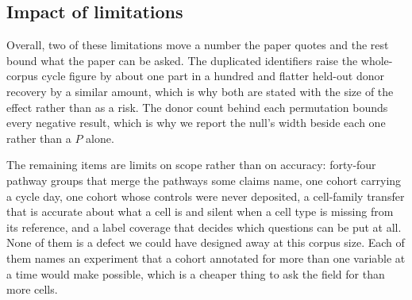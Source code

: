 \subsection{Impact of limitations}

Overall, two of these limitations move a number the paper quotes and the
rest bound what the paper can be asked. The duplicated identifiers raise
the whole-corpus cycle figure by about one part in a hundred and flatter
held-out donor recovery by a similar amount, which is why both are stated
with the size of the effect rather than as a risk. The donor count behind
each permutation bounds every negative result, which is why we report the
null's width beside each one rather than a $P$ alone.

The remaining items are limits on scope rather than on accuracy:
forty-four pathway groups that merge the pathways some claims name, one
cohort carrying a cycle day, one cohort whose controls were never
deposited, a cell-family transfer that is accurate about what a cell is and
silent when a cell type is missing from its reference, and a label coverage
that decides which questions can be put at all. None of them is a defect we could have designed away at this corpus
size. Each of them names an experiment that a cohort annotated for more
than one variable at a time would make possible, which is a cheaper thing
to ask the field for than more cells.

